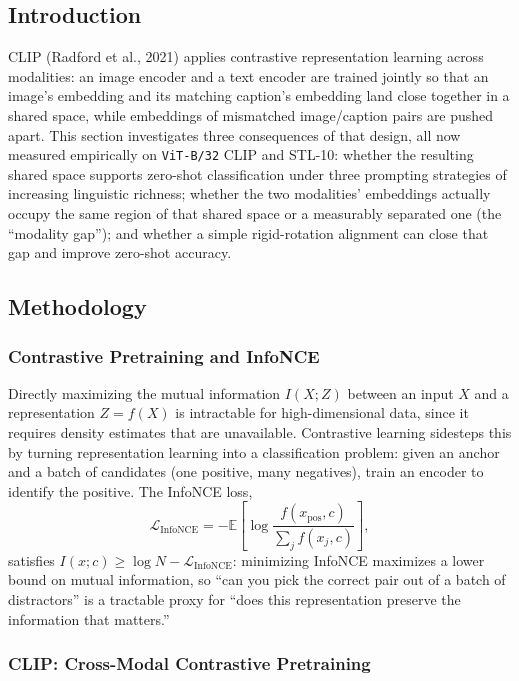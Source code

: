 \subsection{Introduction}

CLIP (Radford et al., 2021) applies contrastive representation learning
across modalities: an image encoder and a text encoder are trained jointly
so that an image's embedding and its matching caption's embedding land close
together in a shared space, while embeddings of mismatched image/caption
pairs are pushed apart. This section investigates three consequences of that
design, all now measured empirically on \texttt{ViT-B/32} CLIP and STL-10:
whether the resulting shared space supports zero-shot classification under
three prompting strategies of increasing linguistic richness; whether the
two modalities' embeddings actually occupy the same region of that shared
space or a measurably separated one (the ``modality gap''); and whether a
simple rigid-rotation alignment can close that gap and improve zero-shot
accuracy.

\subsection{Methodology}

\subsubsection{Contrastive Pretraining and InfoNCE}

Directly maximizing the mutual information $I(X;Z)$ between an input $X$
and a representation $Z=f(X)$ is intractable for high-dimensional data, since
it requires density estimates that are unavailable. Contrastive learning
sidesteps this by turning representation learning into a classification
problem: given an anchor and a batch of candidates (one positive, many
negatives), train an encoder to identify the positive. The InfoNCE loss,
\[
  \mathcal{L}_{\text{InfoNCE}} = -\mathbb{E}\left[\log\frac{f(x_{\text{pos}},c)}{\sum_j f(x_j,c)}\right],
\]
satisfies $I(x;c)\geq\log N - \mathcal{L}_{\text{InfoNCE}}$: minimizing
InfoNCE maximizes a lower bound on mutual information, so ``can you pick the
correct pair out of a batch of distractors'' is a tractable proxy for ``does
this representation preserve the information that matters.''

\subsubsection{CLIP: Cross-Modal Contrastive Pretraining}
\label{sec:clip-methodology}

